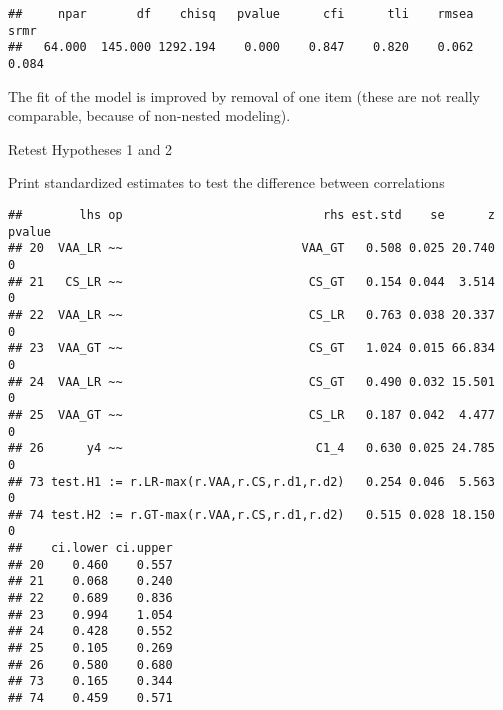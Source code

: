 \documentclass[
]{article}
\newenvironment{Shaded}{\begin{snugshade}}{\end{snugshade}}
\newcommand{\KeywordTok}[1]{\textcolor[rgb]{0.13,0.29,0.53}{\textbf{#1}}}
\newcommand{\NormalTok}[1]{#1}
\newcommand{\OperatorTok}[1]{\textcolor[rgb]{0.81,0.36,0.00}{\textbf{#1}}}
\newcommand{\StringTok}[1]{\textcolor[rgb]{0.31,0.60,0.02}{#1}}
\begin{document}
\begin{verbatim}
##     npar       df    chisq   pvalue      cfi      tli    rmsea     srmr 
##   64.000  145.000 1292.194    0.000    0.847    0.820    0.062    0.084
\end{verbatim}

The fit of the model is improved by removal of one item (these are not
really comparable, because of non-nested modeling).

Retest Hypotheses 1 and 2

Print standardized estimates to test the difference between correlations

\begin{Shaded}
\end{Shaded}

\begin{verbatim}
##        lhs op                            rhs est.std    se      z pvalue
## 20  VAA_LR ~~                         VAA_GT   0.508 0.025 20.740      0
## 21   CS_LR ~~                          CS_GT   0.154 0.044  3.514      0
## 22  VAA_LR ~~                          CS_LR   0.763 0.038 20.337      0
## 23  VAA_GT ~~                          CS_GT   1.024 0.015 66.834      0
## 24  VAA_LR ~~                          CS_GT   0.490 0.032 15.501      0
## 25  VAA_GT ~~                          CS_LR   0.187 0.042  4.477      0
## 26      y4 ~~                           C1_4   0.630 0.025 24.785      0
## 73 test.H1 := r.LR-max(r.VAA,r.CS,r.d1,r.d2)   0.254 0.046  5.563      0
## 74 test.H2 := r.GT-max(r.VAA,r.CS,r.d1,r.d2)   0.515 0.028 18.150      0
##    ci.lower ci.upper
## 20    0.460    0.557
## 21    0.068    0.240
## 22    0.689    0.836
## 23    0.994    1.054
## 24    0.428    0.552
## 25    0.105    0.269
## 26    0.580    0.680
## 73    0.165    0.344
## 74    0.459    0.571
\end{verbatim}
\end{document}
